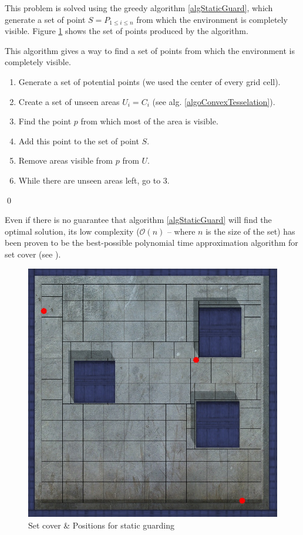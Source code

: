 This problem is solved using the greedy algorithm \ref{algStaticGuard}, which generate a set of point $ S = P_{1\leq i \leq n}$ from which the environment is completely visible. Figure \ref{convexTesselation} shows the set of points produced by the algorithm.

\begin{algorithm}
This algorithm gives a way to find a set of points from which the environment is completely visible.
\begin{enumerate}
	\item Generate a set of potential points (we used the center of every grid cell).
	\item Create a set of unseen areas $U_i = C_i$ (see alg. \ref{algoConvexTesselation}).
	\item Find the point $p$ from which most of the area is visible.
	\item Add this point to the set of point $S$.
	\item Remove areas visible from $p$ from $U$.
	\item While there are unseen areas left, go to 3.
\end{enumerate}
\qed
\label{algStaticGuard}
\end{algorithm}

Even if there is no guarantee that algorithm \ref{algStaticGuard} will find the optimal solution, its low complexity ($\mathcal{O}(n)$ -- where $n$ is the size of the set) has been proven to be the best-possible polynomial time approximation algorithm for set cover (see \cite{approxMinProb}).

\begin{figure}[h!t]
	\begin{center}
	\includegraphics[width=\linewidth,natwidth=824,natheight=823]{fig/staticCoverSet.jpg}
	\end{center}
	\caption{Set cover \& Positions for static guarding}
	\label{convexTesselation}
\end{figure}
